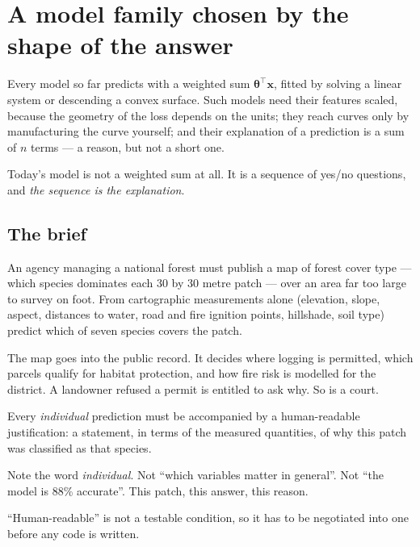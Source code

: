 \documentclass[11pt,a4paper]{article}
\begin{document}

\section{A model family chosen by the shape of the answer}

Every model so far predicts with a weighted sum
$\boldsymbol\theta^{\intercal}\mathbf{x}$, fitted by solving a linear system or
descending a convex surface. Such models need their features scaled, because
the geometry of the loss depends on the units; they reach curves only by
manufacturing the curve yourself; and their explanation of a prediction is a
sum of $n$ terms --- a reason, but not a short one.

Today's model is not a weighted sum at all. It is a sequence of yes/no
questions, and \emph{the sequence is the explanation}.

\subsection{The brief}

An agency managing a national forest must publish a map of forest cover type
--- which species dominates each 30 by 30 metre patch --- over an area far too
large to survey on foot. From cartographic measurements alone (elevation,
slope, aspect, distances to water, road and fire ignition points, hillshade,
soil type) predict which of seven species covers the patch.

The map goes into the public record. It decides where logging is permitted,
which parcels qualify for habitat protection, and how fire risk is modelled for
the district. A landowner refused a permit is entitled to ask why. So is a
court.

\begin{keybox}[title={The requirement that decides the model}]
Every \emph{individual} prediction must be accompanied by a human-readable
justification: a statement, in terms of the measured quantities, of why this
patch was classified as that species.

Note the word \emph{individual}. Not ``which variables matter in general''. Not
``the model is 88\% accurate''. This patch, this answer, this reason.
\end{keybox}

``Human-readable'' is not a testable condition, so it has to be negotiated into
one before any code is written.
\end{document}
